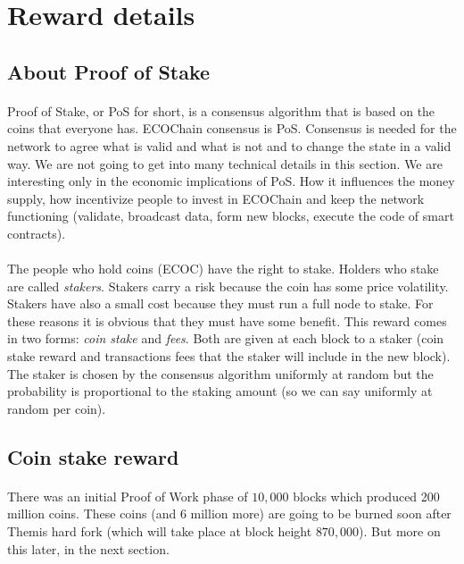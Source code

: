 \documentclass{article}
\begin{document}
\section{Reward details}
\subsection{About Proof of Stake}
\paragraph{}
Proof of Stake, or PoS for short, is a consensus algorithm that is based on the coins that everyone has. ECOChain consensus is PoS. Consensus is needed for the network to agree what is valid and what is not and to change the state in a valid way. We are not going to get into many technical details in this section. We are interesting only in the economic implications of PoS. How it influences the money supply, how incentivize people to invest in ECOChain and keep the network functioning (validate, broadcast data, form new blocks, execute the code of smart contracts).
\paragraph{}
The people who hold coins (ECOC) have the right to stake. Holders who stake are called \emph{stakers}. Stakers carry a risk because the coin has some price volatility. Stakers have also a small cost because they must run a full node to stake. For these reasons it is obvious that they must have some benefit. This reward comes in two forms: \emph{coin stake} and \emph{fees}. Both are given at each block to a staker (coin stake reward and transactions fees that the staker will include in the new block). The staker is chosen by the consensus algorithm uniformly at random but the probability is proportional to the staking amount (so we can say uniformly at random per coin).

\subsection{Coin stake reward}
\paragraph{}
There was an initial Proof of Work phase of $10,000$ blocks which produced 200 million coins. These coins (and 6 million more) are going to be burned soon after Themis hard fork (which will take place at block height $870,000$). But more on this later, in the next section. 
\end{document}
